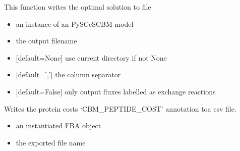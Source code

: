 \documentclass[letterpaper,10pt,english]{sphinxmanual}
\begin{document}

\begin{fulllineitems}
\label{\detokenize{modules_doc:cbmpy.CBWrite.writeOptimalSolution}}
\pysigstartsignatures
{}
\pysigstopsignatures
\sphinxAtStartPar
This function writes the optimal solution to file
\begin{itemize}
\item {} 
\sphinxAtStartPar
{} an instance of an PySCeSCBM model

\item {} 
\sphinxAtStartPar
{} the output filename

\item {} 
\sphinxAtStartPar
{} {[}default=None{]} use current directory if not None

\item {} 
\sphinxAtStartPar
{} {[}default=’,’{]} the column separator

\item {} 
\sphinxAtStartPar
{} {[}default=False{]} only output fluxes labelled as exchange reactions

\end{itemize}

\end{fulllineitems}


\begin{fulllineitems}
\label{\detokenize{modules_doc:cbmpy.CBWrite.writeProteinCostToCSV}}
\pysigstartsignatures
{}
\pysigstopsignatures
\sphinxAtStartPar
Writes the protein costs ‘CBM\_PEPTIDE\_COST’ annotation toa csv file.
\begin{itemize}
\item {} 
\sphinxAtStartPar
{} an instantiated FBA object

\item {} 
\sphinxAtStartPar
{} the exported file name

\end{itemize}

\end{fulllineitems}
\end{document}
